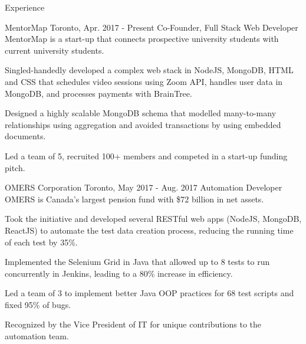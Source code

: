 \documentclass{resume} %
\begin{document}
\begin{rSection}{Experience}

\begin{expSec}
{MentorMap}
{Toronto, Apr. 2017 - Present}
{Co-Founder, Full Stack Web Developer \href{https://www.mentormap.ca/}{\space\small\faExternalLink}}
{MentorMap is a start-up that connects prospective university students with current university students.}
\item Singled-handedly developed a complex web stack in NodeJS, MongoDB, HTML and CSS that schedules video sessions using Zoom API, handles user data in MongoDB, and processes payments with BrainTree.
\item Designed a highly scalable MongoDB schema that modelled many-to-many relationships using aggregation and avoided transactions by using embedded documents.
\item Led a team of 5, recruited 100+ members and competed in a start-up funding pitch.
\end{expSec}

\begin{expSec}
{OMERS Corporation}
{Toronto, May 2017 - Aug. 2017}
{Automation Developer \href{http://www.omers.com/}{\space\small\faExternalLink}}
{OMERS is Canada's largest pension fund with \$72 billion in net assets.}
\item Took the initiative and developed several RESTful web apps \href{https://github.com/jsun98/OMERS_DataCreation}{\small\faGithub}
(NodeJS, MongoDB, ReactJS) to automate the test data creation process, reducing the running time of each test by 35\%.
\item Implemented the Selenium Grid in Java that allowed up to 8 tests to run concurrently in Jenkins, leading to a 80\% increase in efficiency.
\item Led a team of 3 to implement better Java OOP practices for 68 test scripts and fixed 95\% of bugs.
\item Recognized by the Vice President of IT for unique contributions to the automation team.
\end{expSec}



\end{rSection}


\end{document}
